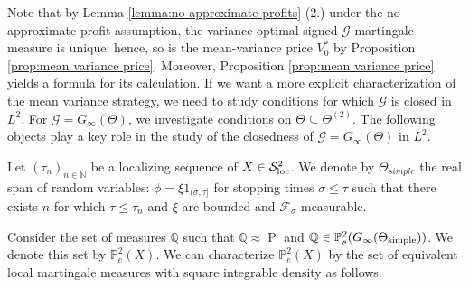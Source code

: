 \documentclass[11pt,a4paper,twoside,openany]{report}
\numberwithin{equation}{section}
\theoremstyle{plain} %
\theoremstyle{definition} %
\theoremstyle{remark} %
\begin{document}
Note that by Lemma \ref{lemma:no approximate profits} (2.) under the no-approximate profit assumption, the variance optimal signed \(\mathcal{G}\)-martingale measure is unique; hence, so is the mean-variance price \(V_0^*\) by Proposition \ref{prop:mean variance price}. Moreover, Proposition \ref{prop:mean variance price} yields a formula for its calculation. 
If we want a more explicit characterization of the mean variance strategy, we need to study conditions for which \(\mathcal{G}\) is closed in \(L^2\). For \(\mathcal{G}=G_{\infty}(\Theta)\), we investigate conditions on \(\Theta\subseteq\Theta^{(2)}\). The following objects play a key role in the study of the closedness of \(\mathcal{G}=G_{\infty}(\Theta)\) in \(L^2\). 




Let \((\tau_n)_{n\in\mathbb{N}}\) be a localizing sequence of \(X\in\mathcal{S}^2_{\rm{loc}}\). We denote by \(\Theta_{simple}\) the real span of random variables: \(\phi=\xi 1_{(\sigma,\tau]}\) for stopping times \(\sigma\leq\tau\) such that there exists \(n\) for which \(\tau\leq\tau_n\) and \(\xi\) are bounded and \(\mathcal{F}_{\sigma}\)-measurable. 


Consider the set of measures \(\mathbb{Q}\) such that \(\mathbb{Q}\approx\mathop{P}\) and \(\mathbb{Q}\in\mathbb{P}_s^2(G_{\infty}(\Theta_{\rm{simple}}))\).
We denote this set by \(\mathbb{P}^2_e(X)\). We can characterize \(\mathbb{P}^2_e(X)\) by the set of equivalent local martingale measures with square integrable density as follows.
\end{document}
